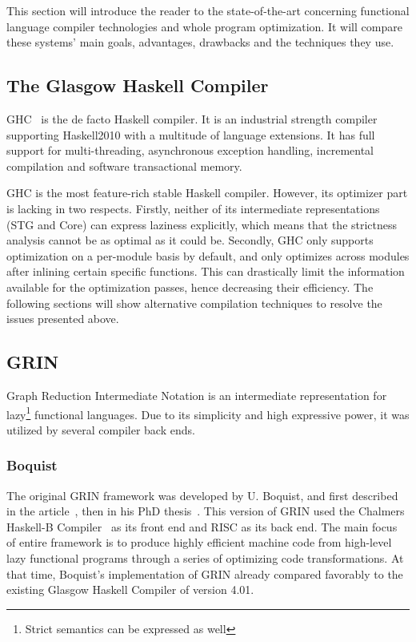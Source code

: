 \documentclass[main.tex]{subfiles}
\begin{document}
	
	This section will introduce the reader to the state-of-the-art concerning functional language compiler technologies and whole program optimization. It will compare these systems' main goals, advantages, drawbacks and the techniques they use.
	
	\subsection{The Glasgow Haskell Compiler}

	GHC~\cite{ghc} is the de facto Haskell compiler. It is an industrial strength compiler supporting Haskell2010 with a multitude of language extensions. It has full support for multi-threading, asynchronous exception handling, incremental compilation and software transactional memory.
	
	GHC is the most feature-rich stable Haskell compiler. However, its optimizer part is lacking in two respects. Firstly, neither of its intermediate representations (STG and Core) can express laziness explicitly, which means that the strictness analysis cannot be as optimal as it could be. Secondly, GHC only supports optimization on a per-module basis by default, and only optimizes across modules after inlining certain specific functions. This can drastically limit the information available for the optimization passes, hence decreasing their efficiency. The following sections will show alternative compilation techniques to resolve the issues presented above.
	
	\subsection{GRIN}
	
	Graph Reduction Intermediate Notation is an intermediate representation for lazy\footnote{Strict semantics can be expressed as well} functional languages. Due to its simplicity and high expressive power, it was utilized by several compiler back ends.
	
	\subsubsection{Boquist}
	
	The original GRIN framework was developed by U. Boquist, and first described in the article~\cite{boquist-grin}, then in his PhD thesis~\cite{boquist-phd}. This version of GRIN used the Chalmers Haskell-B Compiler~\cite{hbc} as its front end and RISC as its back end. The main focus of entire framework is to produce highly efficient machine code from high-level lazy functional programs through a series of optimizing code transformations. At that time, Boquist's implementation of GRIN already compared favorably to the existing Glasgow Haskell Compiler of version 4.01.
	
\end{document}
